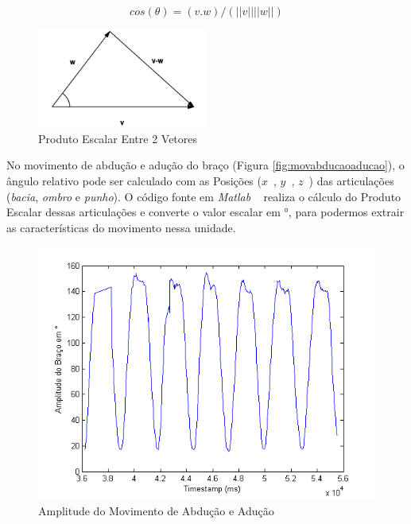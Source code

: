 \begin{equation}
cos(\theta) = (v . w) /  (||v|| ||w||) 
\label{eq:produto_escalar}
\end{equation}


\begin{figure}[!htb]
     \centering
     \includegraphics[width=0.5\textwidth]{./img/produtoescalar.png}
     \caption{Produto Escalar Entre 2 Vetores}
     \label{img:produto_escalar}
\end{figure}

No movimento de abdução e adução do braço (Figura \ref{fig:movabducaoaducao}), o ângulo relativo pode ser calculado com as Posições ($ x $\ ,  $ y $\ , $ z $\ ) das articulações (\textit{bacia}, \textit{ombro} e \textit{punho}). O código fonte em \textit{Matlab} ~\cite{matlab2011} realiza o cálculo do Produto Escalar dessas articulações e converte o valor escalar em °, para podermos extrair as características do movimento nessa unidade.


\begin{figure}[!htb]
     \centering
     \includegraphics[width=1\textwidth]{./img/amplitude-braco.png}
     \caption{Amplitude do Movimento de Abdução e Adução}
     \label{img:amplitude_braco}
\end{figure}

